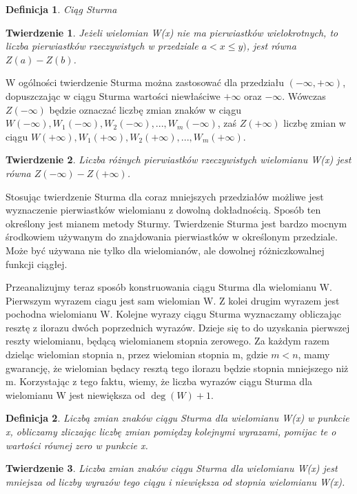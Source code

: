 \documentclass[twoside,a4paper]{book}
\newtheorem{theorem}{Twierdzenie}
\newtheorem{definition}{Definicja}
\begin{document}
\begin{definition}
	Ciąg Sturma
\end{definition}

\begin{theorem}
	Jeżeli wielomian W(x) nie ma pierwiastków wielokrotnych, to liczba pierwiastków rzeczywistych w przedziale $a<x\le y)$, jest równa $Z(a) - Z(b)$.
\end{theorem}

W ogólności twierdzenie Sturma można zastosować dla przedziału $(-\infty,+\infty)$, dopuszczając w ciągu Sturma wartości niewłaściwe $+\infty$ oraz $-\infty$. Wówczas $Z(-\infty)$ będzie oznaczać liczbę zmian znaków w ciągu $W(-\infty), W_1(-\infty), W_2(-\infty),..., W_m(-\infty)$, zaś $Z(+\infty)$ liczbę zmian w ciągu $W(+\infty), W_1(+\infty), W_2(+\infty),..., W_m(+\infty)$.

\begin{theorem}
	Liczba różnych pierwiastków rzeczywistych wielomianu W(x) jest równa $Z(-\infty)-Z(+\infty)$.
\end{theorem}

Stosując twierdzenie Sturma dla coraz mniejszych przedziałów możliwe jest wyznaczenie pierwiastków wielomianu z dowolną dokładnością. Sposób ten określony jest mianem metody Sturmy.
Twierdzenie Sturma jest bardzo mocnym środkowiem używanym do znajdowania pierwiastków w określonym przedziale. Może być używana nie tylko dla wielomianów, ale dowolnej różniczkowalnej funkcji ciągłej.

Przeanalizujmy teraz sposób konstruowania ciągu Sturma dla wielomianu W. Pierwszym wyrazem ciagu jest sam wielomian W. Z kolei drugim wyrazem jest pochodna wielomianu W. Kolejne wyrazy ciągu Sturma wyznaczamy obliczając resztę z ilorazu dwóch poprzednich wyrazów. Dzieje się to do uzyskania pierwszej reszty wielomianu, będącą wielomianem stopnia zerowego. Za każdym razem dzieląc wielomian stopnia n, przez wielomian stopnia m, gdzie $m<n$, mamy gwarancję, że wielomian będacy resztą tego ilorazu będzie stopnia mniejszego niż m. Korzystając z tego faktu, wiemy, że liczba wyrazów ciągu Sturma dla wielomianu W jest niewiększa od $\deg(W)+1$.

\begin{definition}
	Liczbą zmian znaków ciągu Sturma dla wielomianu W(x) w punkcie x, obliczamy zliczając liczbę zmian pomiędzy kolejnymi wyrazami, pomijac te o wartości równej zero w punkcie x.
\end{definition}

\begin{theorem}
	Liczba zmian znaków ciągu Sturma dla wielomianu W(x) jest mniejsza od liczby wyrazów tego ciągu i niewiększa od stopnia wielomianu W(x).
\end{theorem}
\end{document}
